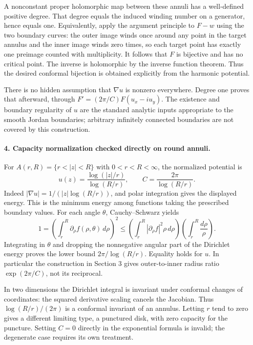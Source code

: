\documentclass[11pt]{article}
\begin{document}
A nonconstant proper holomorphic map between these annuli has a well-defined positive degree. That degree equals the induced winding number on a generator, hence equals one. Equivalently, apply the argument principle to $F-w$ using the two boundary curves: the outer image winds once around any point in the target annulus and the inner image winds zero times, so each target point has exactly one preimage counted with multiplicity. It follows that $F$ is bijective and has no critical point. The inverse is holomorphic by the inverse function theorem. Thus the desired conformal bijection is obtained explicitly from the harmonic potential.

There is no hidden assumption that $\nabla u$ is nonzero everywhere. Degree one proves that afterward, through $F'=(2\pi/C)F(u_x-iu_y)$. The existence and boundary regularity of $u$ are the standard analytic inputs appropriate to the smooth Jordan boundaries; arbitrary infinitely connected boundaries are not covered by this construction.

\paragraph{4. Capacity normalization checked directly on round annuli.}
For $A(r,R)=\{r<|z|<R\}$ with $0<r<R<\infty$, the normalized potential is
\[
 u(z)=\frac{\log(|z|/r)}{\log(R/r)},\qquad
 C=\frac{2\pi}{\log(R/r)}.
\]
Indeed $|\nabla u|=1/(|z|\log(R/r))$, and polar integration gives the displayed energy. This is the minimum energy among functions taking the prescribed boundary values. For each angle $\theta$, Cauchy--Schwarz yields
\[
 1=\left(\int_r^R\partial_\rho f(\rho,\theta)\,d\rho\right)^2
 \leq\left(\int_r^R|\partial_\rho f|^2\rho\,d\rho\right)
       \left(\int_r^R\frac{d\rho}{\rho}\right).
\]
Integrating in $\theta$ and dropping the nonnegative angular part of the Dirichlet energy proves the lower bound $2\pi/\log(R/r)$. Equality holds for $u$. In particular the construction in Section 3 gives outer-to-inner radius ratio $\exp(2\pi/C)$, not its reciprocal.

In two dimensions the Dirichlet integral is invariant under conformal changes of coordinates: the squared derivative scaling cancels the Jacobian. Thus $\log(R/r)/(2\pi)$ is a conformal invariant of an annulus. Letting $r$ tend to zero gives a different limiting type, a punctured disk, with zero capacity for the puncture. Setting $C=0$ directly in the exponential formula is invalid; the degenerate case requires its own treatment.
\end{document}
